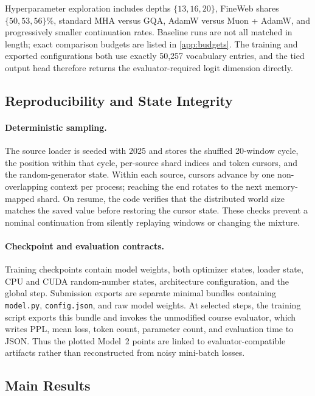 \documentclass{article}
\begin{document}
Hyperparameter exploration includes depths $\{13,16,20\}$, FineWeb shares
$\{50,53,56\}\%$, standard MHA versus GQA, AdamW versus Muon + AdamW, and
progressively smaller continuation rates. Baseline runs are not all matched in
length; exact comparison budgets are listed in \cref{app:budgets}. The
training and exported configurations both use exactly 50,257 vocabulary
entries, and the tied output head therefore returns the evaluator-required
logit dimension directly.

\subsection{Reproducibility and State Integrity}
\label{sec:reproducibility}

\paragraph{Deterministic sampling.}
The source loader is seeded with 2025 and stores the shuffled 20-window cycle,
the position within that cycle, per-source shard indices and token cursors,
and the random-generator state. Within each source, cursors advance by one
non-overlapping context per process; reaching the end rotates to the next
memory-mapped shard. On resume, the code verifies that the distributed world
size matches the saved value before restoring the cursor state. These checks
prevent a nominal continuation from silently replaying windows or changing
the mixture.

\paragraph{Checkpoint and evaluation contracts.}
Training checkpoints contain model weights, both optimizer states, loader
state, CPU and CUDA random-number states, architecture configuration, and the
global step. Submission exports are separate minimal bundles containing
\texttt{model.py}, \texttt{config.json}, and raw model weights. At selected
steps, the training script exports this bundle and invokes the unmodified
course evaluator, which writes PPL, mean loss, token count, parameter count,
and evaluation time to JSON. Thus the plotted Model~2 points are linked to
evaluator-compatible artifacts rather than reconstructed from noisy
mini-batch losses.

\subsection{Main Results}
\label{sec:main-results}
\end{document}
